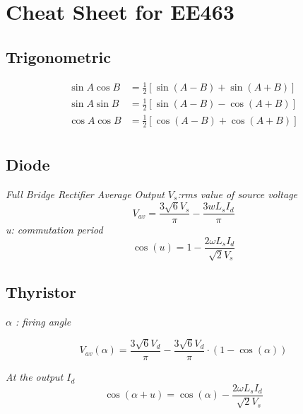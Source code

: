 \documentclass[twocolumn, ]{article}
\begin{document}
\section{\small Cheat Sheet for EE463}

\subsection{ \small Trigonometric }

\begin{align*}
          \sin A \cos B &= \frac{1}{2}\left[ \sin(A-B)+\sin(A+B) \right] \\
          \sin A \sin B &= \frac{1}{2}\left[ \sin(A-B)-\cos(A+B) \right] \\
          \cos A \cos B &= \frac{1}{2}\left[ \cos(A-B)+\cos(A+B) \right] \\         
\end{align*}

\subsection{\small Diode}

\textit{Full Bridge Rectifier Average Output $V_{s}$:rms value of source voltage}
\begin{equation*}
 	V_{av}=\frac{3 \sqrt{6} V_{s}}{\pi }-\frac{3wL_{s}I_{d}}{\pi }
\end{equation*}
\textit {u: commutation period}
\begin{equation*}
 	\cos(u)=1-\dfrac{2\omega L_{s} I_{d}}{\sqrt[]{2}V_{s}}
\end{equation*}

\subsection{\small Thyristor}
\textit{$\alpha$ : firing angle}

\begin{equation*}
	V_{av}(\alpha)=\frac{3 \sqrt{6} V_{d}}{\pi }-\frac{ 3 \sqrt{6} V_{d}}{\pi }\cdot (1-\cos(\alpha))
\end{equation*}

\textit{At the output $I_{d}$}
\begin{equation*}
	\cos(\alpha + u)=\cos(\alpha)-\dfrac{2\omega L_{s} I_{d}}{\sqrt[]{2}V_{s}}
\end{equation*}
\end{document}
